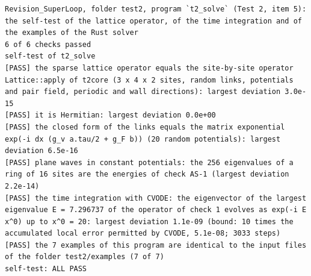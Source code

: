 \documentclass[
  10pt,
]{article}
\begin{document}
\begin{verbatim}
Revision_SuperLoop, folder test2, program `t2_solve` (Test 2, item 5): the self-test of the lattice operator, of the time integration and of the examples of the Rust solver
6 of 6 checks passed
self-test of t2_solve
[PASS] the sparse lattice operator equals the site-by-site operator Lattice::apply of t2core (3 x 4 x 2 sites, random links, potentials and pair field, periodic and wall directions): largest deviation 3.0e-15
[PASS] it is Hermitian: largest deviation 0.0e+00
[PASS] the closed form of the links equals the matrix exponential exp(-i dx (g_v a.tau/2 + g_F b)) (20 random potentials): largest deviation 6.5e-16
[PASS] plane waves in constant potentials: the 256 eigenvalues of a ring of 16 sites are the energies of check AS-1 (largest deviation 2.2e-14)
[PASS] the time integration with CVODE: the eigenvector of the largest eigenvalue E = 7.296737 of the operator of check 1 evolves as exp(-i E x^0) up to x^0 = 20: largest deviation 1.1e-09 (bound: 10 times the accumulated local error permitted by CVODE, 5.1e-08; 3033 steps)
[PASS] the 7 examples of this program are identical to the input files of the folder test2/examples (7 of 7)
self-test: ALL PASS
\end{verbatim}
\end{document}
